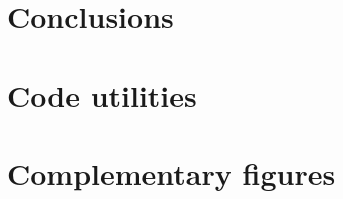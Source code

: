 \documentclass[12pt,letterpaper,oneside]{book}
\begin{document}
\chapter{Conclusions}






\appendix
\appendixpage
\noappendicestocpagenum
\addappheadtotoc

\chapter{Code utilities}


\chapter{Complementary figures}

\end{document}
